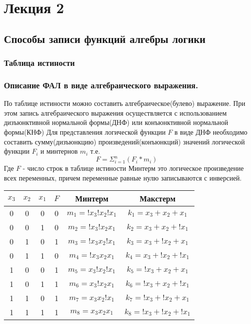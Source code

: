 \documentclass[a4paper]{article}
\begin{document}
\section{Лекция 2}
\subsection{Способы записи функций алгебры логики}
\subsubsection{Таблица истиности}
\subsubsection{Описание ФАЛ в виде алгебраического выражения.}
По таблице истиности можно составить алгебраическое(булево) выражение. При этом запись алгебраического выражения осуществляется с использованием дизъюнктивной нормальной формы(ДНФ)
или конъюнктивной нормальной формы(КНФ)
Для представления логической функции $F$ в виде ДНФ необходимо составить сумму(дизъюнкцию)
произведений(конъюнкций) значений логической функции $F_i$ и минтернов $m_i$ т.е.
$$ F = \Sigma_{i = 1}^n (F_i * m_i) $$ Где $F$ - число строк в таблице истиности
Минтерм это логическое произведение всех переменных, причем переменные равные нулю записываются с инверсией.

\begin{table}[ht]
\centering
\begin{tabular}{|c|c|c|c|c|c|}
\hline
$x_3$ & $x_2$ & $x_1$ & $F$ & Минтерм & Макстерм \\
\hline
0 & 0 & 0 & 0 & $ m_1 = !x_3!x_2!x_1 $ & $ k_1 = x_3 + x_2 + x_1    $ \\
0 & 0 & 1 & 0 & $ m_2 = !x_3!x_2x_1  $ & $ k_2 = x_3 + x_2 + !x_1   $ \\
0 & 1 & 0 & 1 & $ m_3 = !x_3x_2!x_1  $ & $ k_3 = x_3 + !x_2 + x_1   $ \\
0 & 1 & 1 & 0 & $ m_4 = !x_3x_2x_1   $ & $ k_4 = x_3 + !x_2 + !x_1  $ \\
1 & 0 & 0 & 1 & $ m_5 = x_3!x_2!x_1  $ & $ k_5 = !x_3 + x_2 + x_1   $ \\
1 & 0 & 1 & 1 & $ m_6 = x_3!x_2x_1   $ & $ k_6 = !x_3 + x_2 + !x_1  $ \\
1 & 1 & 0 & 1 & $ m_7 = x_3x_2!x_1   $ & $ k_7 = !x_3 + !x_2 + x_1  $ \\
1 & 1 & 1 & 1 & $ m_8 = x_3x_2x_1    $ & $ k_8 = !x_3 + !x_2 + !x_1 $ \\
\hline
\end{tabular}
\end{table}
\end{document}
